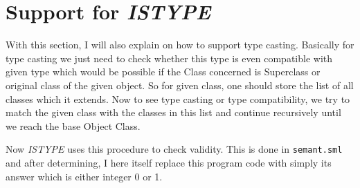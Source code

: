 \section{Support for \textit{ISTYPE}}

With this section, I will also explain on how to support type casting. Basically for type casting we just need to check whether this type is even compatible with given type which would be possible if the Class concerned is Superclass or original class of the given object. So for given class, one should store the list of all classes which it extends. Now to see type casting or type compatibility, we try to match the given class with the classes in this list and continue recursively until we reach the base Object Class.

Now \textit{ISTYPE} uses this procedure to check validity. This is done in \texttt{semant.sml} and after determining, I here itself replace this program code with simply its answer which is either integer 0 or 1. 